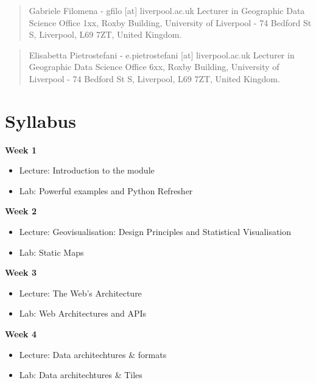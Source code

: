 \documentclass[
  letterpaper,
  DIV=11,
  numbers=noendperiod]{scrreprt}
\begin{document}
\begin{quote}
Gabriele Filomena - gfilo {[}at{]} liverpool.ac.uk Lecturer in
Geographic Data Science Office 1xx, Roxby Building, University of
Liverpool - 74 Bedford St S, Liverpool, L69 7ZT, United Kingdom.
\end{quote}

\begin{quote}
Elisabetta Pietrostefani - e.pietrostefani {[}at{]} liverpool.ac.uk
Lecturer in Geographic Data Science Office 6xx, Roxby Building,
University of Liverpool - 74 Bedford St S, Liverpool, L69 7ZT, United
Kingdom.
\end{quote}


\chapter*{Syllabus}\label{syllabus}


\textbf{Week 1}

\begin{itemize}
\item
  Lecture: Introduction to the module
\item
  Lab: Powerful examples and Python Refresher
\end{itemize}

\textbf{Week 2}

\begin{itemize}
\item
  Lecture: Geovisualisation: Design Principles and Statistical
  Visualisation
\item
  Lab: Static Maps
\end{itemize}

\textbf{Week 3}

\begin{itemize}
\item
  Lecture: The Web's Architecture
\item
  Lab: Web Architectures and APIs
\end{itemize}

\textbf{Week 4}

\begin{itemize}
\item
  Lecture: Data architechtures \& formats
\item
  Lab: Data architechtures \& Tiles
\end{itemize}
\end{document}
